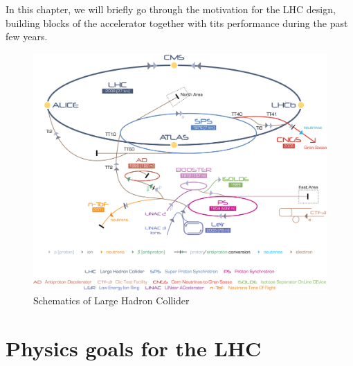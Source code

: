 In this chapter, we will briefly go through the motivation for the LHC design, building blocks of the accelerator together with tits performance during the past few years.   
\begin{figure}[htbp]
	\centering
		\includegraphics[width=\textwidth]{Figures/LHC.jpg}
	\caption[Schematics of Large Hadron Collider]{Schematics of Large Hadron Collider}
	\label{fig:LHC}
\end{figure}

\section{Physics goals for the LHC}

